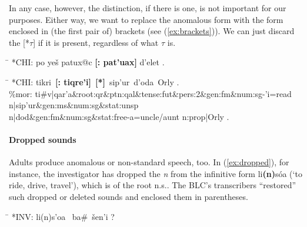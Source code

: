 In any case, however, the distinction, if there is one, is not important for our purposes. 
Either way, we want to replace the anomalous form with the form enclosed in 
(the first pair of) brackets (see (\ref{ex:brackets})). We can just discard the \textsf{[*$\tau$]} 
if it is present, regardless of what $\tau$ is.

\begin{exe}
\label{ex:brackets}
\ex \begin{xlist} 
   \ex\label{ex:repl1} \begin{tabbing}  
	\hspace{0.6in} \= \hspace{5.5in} \kill
	\textsf{*CHI:} \> \textsf{po ye\v{s} patux@c \textbf{[: pat\a'{u}ax]} d\a'{e}let .}
	\end{tabbing}
     \ex\label{ex:repl2} \begin{tabbing}
	\hspace{0.6in} \= \hspace{5.5in} \kill
	\textsf{*CHI:} \> \textsf{tikri \,\textbf{[: tiqre\a'{i}]}\, \textbf{[*]}\, 
	sip\a'{u}r\, d\a'{o}da\, Orly .} \\
	\textsf{\%mor:} \> \textsf{ti\#v|qar\a'{a}\&root:qr\&ptn:qal\&tense:fut\&pers:2\&gen:fm\&num:sg-\a'{i}=read} \\
                    \> \textsf{n|sip\a'{u}r\&gen:ms\&num:sg\&stat:unsp } \\
                    \> \textsf{n|dod\&gen:fm\&num:sg\&stat:free-a=uncle/aunt} \textsf{n:prop|Orly .}
	\end{tabbing}
   \end{xlist}
\end{exe}

\paragraph{Dropped sounds}
Adults produce anomalous or non-standard speech, too. In (\ref{ex:dropped}), for instance, the investigator 
has dropped the 
\emph{n} from the infinitive form 
\textsf{li\textbf{(n)}s\'oa} (`to ride, drive, travel'), 
which is of the root n.s.. 
The \ac{BLC}'s transcribers ``restored'' such dropped or deleted sounds and enclosed them in parentheses.
\begin{exe} \label{ex:dropped}
\ex \begin{tabbing}
\hspace{0.6in} \= \hspace{5.5in} \kill
\textsf{*INV:} \> \textsf{li(n)s\a'{o}a \, ba\#\, \v{s}en\a'{i} ?}
\end{tabbing}
\end{exe}

